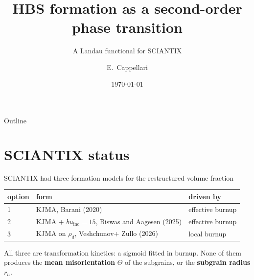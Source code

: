 \documentclass[10pt,aspectratio=169]{beamer}
\title{HBS formation as a second-order phase transition}
\subtitle{A Landau functional for SCIANTIX}
\author{E.\ Cappellari}
\date{\today}
\begin{document}
\maketitle

\begin{frame}{Outline}
  \small
  \tableofcontents
\end{frame}

\section{SCIANTIX status}

\begin{frame}{SCIANTIX had three formation models for the restructured volume fraction}
  \begin{center}
  \small
  \begin{tabular}{lll}
    \toprule
    option & form & driven by \\
    \midrule
    1 & KJMA, Barani (2020)\footnotemark[1] & effective burnup \\
    2 & KJMA $+$ $bu_{\text{inc}} = 15$, Biswas and Aagesen (2025)\footnotemark[2] & effective burnup \\
    3 & KJMA on $\rho_d$, Veshchunov\footnotemark[3] + Zullo (2026) & local burnup \\
    \bottomrule
  \end{tabular}
  \end{center}

  \vspace{0.4em}
  All three are \alert{transformation kinetics}: a sigmoid fitted in burnup. None of them produces
    the \textbf{mean misorientation} $\Theta$ of the subgrains, or the \textbf{subgrain radius} $r_n$.

\end{frame}
\end{document}
